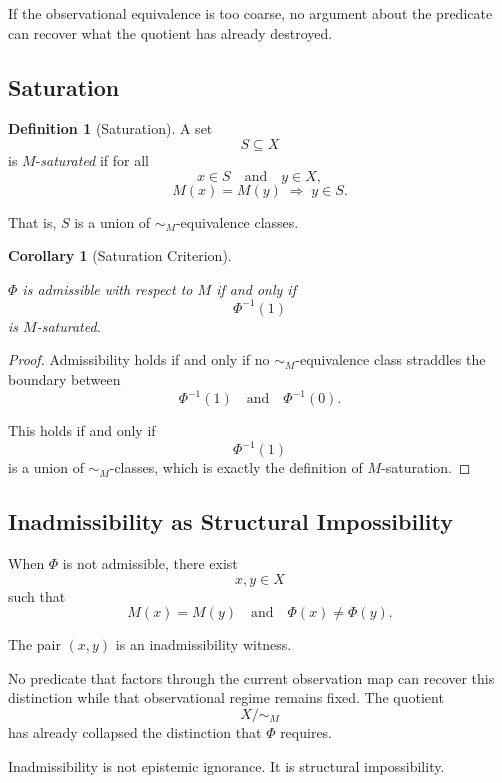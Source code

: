 \documentclass[12pt]{article}
\theoremstyle{plain}
\newtheorem{corollary}[theorem]{Corollary}
\theoremstyle{definition}
\newtheorem{definition}[theorem]{Definition}
\theoremstyle{remark}
\begin{document}
If the observational equivalence is too coarse, no argument about the
predicate can recover what the quotient has already destroyed.

\subsection{Saturation}

\begin{definition}[Saturation]

A set
\[
S \subseteq X
\]
is $M$-\emph{saturated} if for all
\[
x \in S
\quad\text{and}\quad
y \in X,
\]
\[
M(x) = M(y)
\;\Rightarrow\;
y \in S.
\]

That is, $S$ is a union of $\sim_M$-equivalence classes.
\end{definition}

\begin{corollary}[Saturation Criterion]
\label{cor:saturation}

$\Phi$ is admissible with respect to $M$ if and only if
\[
\Phi^{-1}(1)
\]
is $M$-saturated.
\end{corollary}

\begin{proof}

Admissibility holds if and only if no $\sim_M$-equivalence class
straddles the boundary between
\[
\Phi^{-1}(1)
\quad\text{and}\quad
\Phi^{-1}(0).
\]

This holds if and only if
\[
\Phi^{-1}(1)
\]
is a union of $\sim_M$-classes, which is exactly the definition of
$M$-saturation.
\end{proof}

\subsection{Inadmissibility as Structural Impossibility}

When $\Phi$ is not admissible, there exist
\[
x, y \in X
\]
such that
\[
M(x) = M(y)
\quad\text{and}\quad
\Phi(x) \neq \Phi(y).
\]

The pair $(x,y)$ is an inadmissibility witness.

No predicate that factors through the current observation map can
recover this distinction while that observational regime remains fixed.
The quotient
\[
X/{\sim_M}
\]
has already collapsed the distinction that $\Phi$ requires.

Inadmissibility is not epistemic ignorance.
It is structural impossibility.
\end{document}
